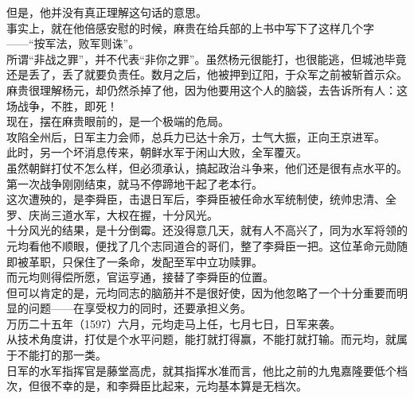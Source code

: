 \begin{multicols}{\theparacolNo}
但是，他并没有真正理解这句话的意思。\\

事实上，就在他倍感安慰的时候，麻贵在给兵部的上书中写下了这样几个字——“按军法，败军则诛”。\\

所谓“非战之罪”，并不代表“非你之罪”。虽然杨元很能打，也很能逃，但城池毕竟还是丢了，丢了就要负责任。数月之后，他被押到辽阳，于众军之前被斩首示众。\\

麻贵很理解杨元，却仍然杀掉了他，因为他要用这个人的脑袋，去告诉所有人：这场战争，不胜，即死！\\

现在，摆在麻贵眼前的，是一个极端的危局。\\

攻陷全州后，日军主力会师，总兵力已达十余万，士气大振，正向王京进军。\\

此时，另一个坏消息传来，朝鲜水军于闲山大败，全军覆灭。\\

虽然朝鲜打仗不怎么样，但必须承认，搞起政治斗争来，他们还是很有点水平的。第一次战争刚刚结束，就马不停蹄地干起了老本行。\\

这次遭殃的，是李舜臣，击退日军后，李舜臣被任命水军统制使，统帅忠清、全罗、庆尚三道水军，大权在握，十分风光。\\

十分风光的结果，是十分倒霉。还没得意几天，就有人不高兴了，同为水军将领的元均看他不顺眼，便找了几个志同道合的哥们，整了李舜臣一把。这位革命元勋随即被革职，只保住了一条命，发配至军中立功赎罪。\\

而元均则得偿所愿，官运亨通，接替了李舜臣的位置。\\

但可以肯定的是，元均同志的脑筋并不是很好使，因为他忽略了一个十分重要而明显的问题——在享受权力的同时，还要承担义务。\\

万历二十五年（1597）六月，元均走马上任，七月七日，日军来袭。\\

从技术角度讲，打仗是个水平问题，能打就打得赢，不能打就打输。而元均，就属于不能打的那一类。\\

日军的水军指挥官是藤堂高虎，就其指挥水准而言，他比之前的九鬼嘉隆要低个档次，但很不幸的是，和李舜臣比起来，元均基本算是无档次。\\


\end{multicols}
